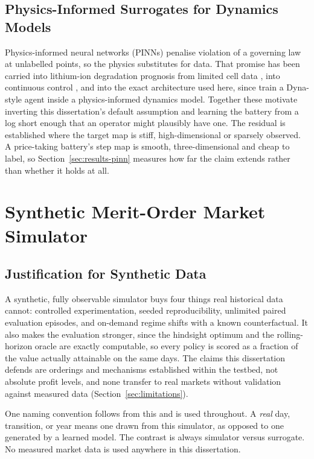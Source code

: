 \documentclass[conference]{IEEEtran}
\begin{document}
\subsection{Physics-Informed Surrogates for Dynamics Models}
\label{sec:related-pinn}

Physics-informed neural networks (PINNs) \citep{raissi2019pinn} penalise violation of a governing law at unlabelled points, so the physics substitutes for data. That promise has been carried into lithium-ion degradation prognosis from limited cell data \citep{wang2024pinnbattery}, into continuous control \citep{antonelo2024pinc}, and into the exact architecture used here, since \citet{Liu_2021} train a Dyna-style agent inside a physics-informed dynamics model. Together these motivate inverting this dissertation's default assumption and learning the battery from a log short enough that an operator might plausibly have one. The residual is established where the target map is stiff, high-dimensional or sparsely observed. A price-taking battery's step map is smooth, three-dimensional and cheap to label, so Section~\ref{sec:results-pinn} measures how far the claim extends rather than whether it holds at all.

\section{Synthetic Merit-Order Market Simulator}
\label{sec:simulator}

\subsection{Justification for Synthetic Data}

A synthetic, fully observable simulator buys four things real historical data cannot: controlled experimentation, seeded reproducibility, unlimited paired evaluation episodes, and on-demand regime shifts with a known counterfactual. It also makes the evaluation stronger, since the hindsight optimum and the rolling-horizon oracle are exactly computable, so every policy is scored as a fraction of the value actually attainable on the same days. The claims this dissertation defends are orderings and mechanisms established within the testbed, not absolute profit levels, and none transfer to real markets without validation against measured data (Section~\ref{sec:limitations}).

One naming convention follows from this and is used throughout. A \emph{real} day, transition, or year means one drawn from this simulator, as opposed to one generated by a learned model. The contrast is always simulator versus surrogate. No measured market data is used anywhere in this dissertation.
\end{document}
